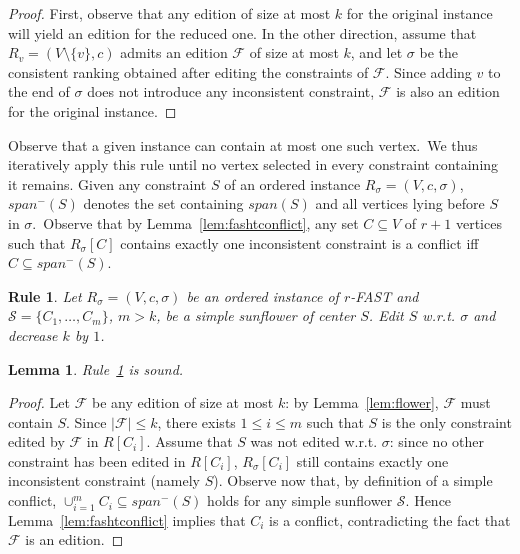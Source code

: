 \documentclass[11pt]{article}
\newtheorem{lemma}[theorem]{Lemma}
\newtheorem{polyrule}{Rule}[section]
\begin{document}
\begin{proof}
	First, observe that any edition of size at most $k$ for the original instance will yield an edition for the reduced one. In the other direction, assume that $R_v = (V \setminus \{v\}, c)$ admits an edition $\mathcal{F}$ of size at most $k$, and let $\sigma$ be the consistent ranking obtained after editing the constraints of $\mathcal{F}$. Since adding $v$ to the end of $\sigma$ does not introduce any inconsistent constraint, $\mathcal{F}$ is also an edition for the original instance.
 \end{proof}

Observe that a given instance can contain at most one such vertex.~We thus iteratively apply this rule until no vertex selected in every constraint containing it remains. 
Given any constraint $S$ of an ordered instance $R_\sigma = (V, c, \sigma)$, $span^-(S)$ denotes the set containing $span(S)$ and all vertices lying before $S$ in $\sigma$.~Observe that by Lemma~\ref{lem:fashtconflict}, any set $C \subseteq V$ of $r+1$ vertices such that $R_\sigma[C]$ contains exactly one inconsistent constraint is a conflict iff $C \subseteq span^-(S)$. 

\begin{polyrule}
\label{rule:correctFASHT}
	Let $R_\sigma = (V, c, \sigma)$ be an ordered instance of {\sc $r$-FAST}  and $\mathcal{S} = \{C_1, \ldots, C_m\}$, $m > k$, 
	be a simple sunflower of center $S$. Edit $S$ w.r.t. $\sigma$ and decrease $k$ by $1$.

\end{polyrule}

\begin{lemma}
\label{lem:correctFASHT}
	Rule~\ref{rule:correctFASHT} is sound. 

\end{lemma}

\begin{proof}
	Let $\mathcal{F}$ be any edition of size at most $k$: by Lemma~\ref{lem:flower}, $\mathcal{F}$ must contain $S$. Since $|\mathcal{F}| \leqslant k$, there exists $1 \leqslant i \leqslant m$ such that $S$ is the only constraint edited by $\mathcal{F}$ in $R[C_i]$. Assume that $S$ was not edited w.r.t. $\sigma$: since no other constraint has been edited in $R[C_{i}]$, $R_\sigma[C_i]$ still contains exactly one inconsistent constraint (namely $S$). Observe now that, by definition of a simple conflict, $\cup_{i=1}^m C_i \subseteq span^-(S)$ holds for any simple sunflower $\mathcal{S}$. Hence Lemma~\ref{lem:fashtconflict} implies that $C_i$ is 
	a conflict, contradicting the fact that $\mathcal{F}$ is an edition. 
 \end{proof}
\end{document}

